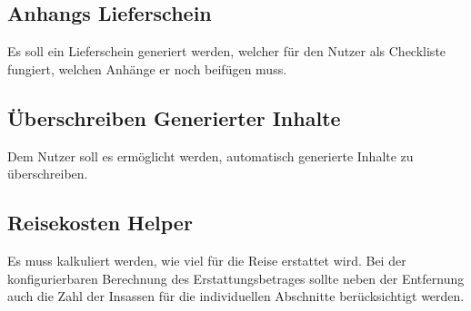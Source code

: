 \subsection{Anhangs Lieferschein}\label{subsec:anhangs-lieferschein}
Es soll ein Lieferschein generiert werden, welcher für den Nutzer als Checkliste fungiert, welchen Anhänge er noch beifügen muss.
\subsection{Überschreiben Generierter Inhalte}\label{subsec:uberschreiben-generierter-inhalte}
Dem Nutzer soll es ermöglicht werden, automatisch generierte Inhalte zu überschreiben.
\subsection{Reisekosten Helper}\label{subsec:reisekosten-helper}
Es muss kalkuliert werden, wie viel für die Reise erstattet wird.
Bei der konfigurierbaren Berechnung des Erstattungsbetrages sollte neben der Entfernung auch die Zahl der Insassen für
die individuellen Abschnitte berücksichtigt werden.